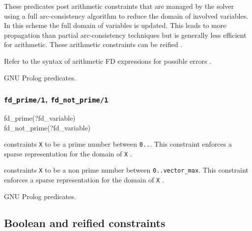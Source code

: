 These predicates post arithmetic constraints that are managed by the solver
using a full arc-consistency algorithm to reduce the domain of involved
variables. In this scheme the full domain of variables is updated. This
leads to more propagation than partial arc-consistency techniques  but is generally less efficient for arithmetic.
These arithmetic constraints can be reified .

\Errors

Refer to the syntax of arithmetic FD expressions for possible errors
.

\Portability

GNU Prolog predicates.

\subsubsection{\texttt{fd\_prime/1},
\texttt{fd\_not\_prime/1}}

\begin{TemplatesOneCol}
fd\_prime(?fd\_variable)\\
fd\_not\_prime(?fd\_variable)

\end{TemplatesOneCol}

\Description

 constraints \texttt{X} to be a prime number between
\texttt{0..}.
This constraint enforces a sparse representation
for the domain of \texttt{X} .

 constraints \texttt{X} to be a non prime number
between \texttt{0..vector\_max}. This constraint enforces a sparse
representation for the domain of \texttt{X} .

\begin{PlErrors}


\end{PlErrors}

\Portability

GNU Prolog predicates.

\subsection{Boolean and reified constraints}
\label{Boolean-and-reified-constraints}

